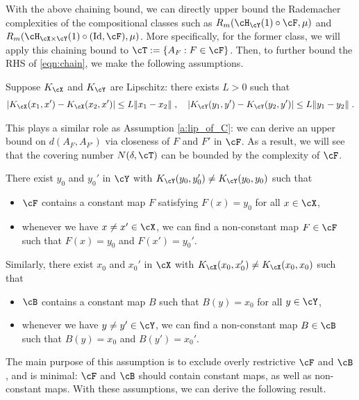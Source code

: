 \documentclass[11pt]{article}
\begin{document}
With the above chaining bound, we can directly upper bound the Rademacher complexities of the compositional classes such as $R_m(\cH_{\cY}(1)\circ \cF, \mu)$ and $R_m(\cH_{\cX \times \cY}(1) \circ (\mathrm{Id}, \cF), \mu)$. More specifically, for the former class, we will apply this chaining bound to $\cT := \{ A_F : F \in \cF \}$. Then, to further bound the RHS of \eqref{eqn:chain}, we make the following assumptions.

\begin{assumption}
	\label{a:lip_kernels}
	Suppose $K_{\cX}$ and $K_{\cY}$ are Lipschitz: there exists $L > 0$ such that
	\begin{align*}
		|K_{\cX}(x_1, x') - K_{\cX}(x_2, x')| \le L \|x_1 - x_2\| \;, 
		\quad |K_{\cY}(y_1, y') - K_{\cY}(y_2, y')| \le L \|y_1 - y_2\| \;.
	\end{align*}
\end{assumption}
This plays a similar role as Assumption \ref{a:lip_of_C}: we can derive an upper bound on $d(A_F, A_{F'})$ via closeness of $F$ and $F'$ in $\cF$. As a result, we will see that the covering number $N(\delta, \cT)$ can be bounded by the complexity of $\cF$. 


\begin{assumption}
	\label{a:separation}
	There exist $y_0$ and $y_0'$ in $\cY$ with $K_{\cY}(y_0, y_0') \neq K_{\cY}(y_0, y_0)$ such that 
	\begin{itemize}
		\item $\cF$ contains a constant map $F$ satisfying $F(x) = y_0$ for all $x \in \cX$, 
		\item whenever we have $x \neq x' \in \cX$, we can find a non-constant map $F \in \cF$ such that $F(x) = y_0$ and $F(x') = y_0'$. 
	\end{itemize}
	Similarly, there exist $x_0$ and $x_0'$ in $\cX$ with $K_{\cX}(x_0, x_0') \neq K_{\cX}(x_0, x_0)$ such that 
	\begin{itemize}
		\item $\cB$ contains a constant map $B$ such that $B(y) = x_0$ for all $y \in \cY$, 
		\item whenever we have $y \neq y' \in \cY$, we can find a non-constant map $B \in \cB$ such that $B(y) = x_0$ and $B(y') = x_0'$. 
	\end{itemize}
\end{assumption}
The main purpose of this assumption is to exclude overly restrictive $\cF$ and $\cB$, and is minimal: $\cF$ and $\cB$ should contain constant maps, as well as non-constant maps. With these assumptions, we can derive the following result.
\end{document}
